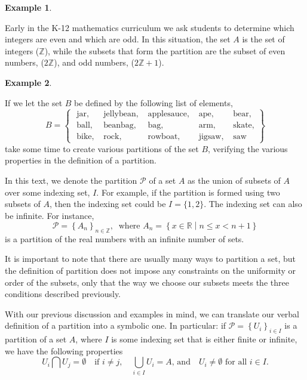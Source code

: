 \documentclass[
]{book}
\theoremstyle{definition}
\theoremstyle{definition}
\newtheorem{example}{Example}[chapter]
\theoremstyle{definition}
\theoremstyle{definition}
\theoremstyle{remark}
\begin{document}
\begin{example}
\protect\hypertarget{exm:unlabeled-div-22}{}\label{exm:unlabeled-div-22}

Early in the K-12 mathematics curriculum we ask students to determine which integers are even and which are odd. In this situation, the set \(A\) is the set of integers (\(\mathbb{Z}\)), while the subsets that form the partition are the subset of even numbers, (\(2\mathbb{Z}\)), and odd numbers, (\(2\mathbb{Z}+1\)).

\end{example}

\begin{example}
\protect\hypertarget{exm:unlabeled-div-23}{}\label{exm:unlabeled-div-23}

If we let the set \(B\) be defined by the following list of elements,
\[B = \begin{Bmatrix} 
\mbox{ jar},  & \mbox{ jellybean} ,  & \mbox{ applesauce}, & \mbox{ ape}, & \mbox{ bear}, \\
\mbox{ ball}, & \mbox{ beanbag}, & \mbox{ bag}, & \mbox{ arm} , & \mbox{ skate} , \\
\mbox{ bike}, & \mbox{ rock}, & \mbox{ rowboat},   &  \mbox{ jigsaw}, & \mbox{ saw}
 \end{Bmatrix}\]
take some time to create various partitions of the set \(B\), verifying the various properties in the definition of a partition.

\end{example}

In this text, we denote the partition \(\mathcal{P}\) of a set \(A\) as the union of subsets of \(A\) over some indexing set, \(I\). For example, if the partition is formed using two subsets of \(A\), then the indexing set could be \(I=\{1,2\}\). The indexing set can also be infinite. For instance,
\[\mathcal{P} = \left\{ A_n  \right\}_{n\in \mathbb{Z}}, \: \mbox{ where } A_n=\left\{x\in \mathbb{R}\middle \vert n\leq x < n+1  \right\}\] is a partition of the real numbers with an infinite number of sets.

It is important to note that there are usually many ways to partition a set, but the definition of partition does not impose any constraints on the uniformity or order of the subsets, only that the way we choose our subsets meets the three conditions described previously.

With our previous discussion and examples in mind, we can translate our verbal definition of a partition into a symbolic one. In particular: if \(\mathcal{P}= \left\{ U_i\right\}_{i\in I}\) is a partition of a set \(A\), where \(I\) is some indexing set that is either finite or infinite, we have the following properties
\[U_i \bigcap U_j = \emptyset \quad \mbox{if } i\neq j, \quad \bigcup_{i\in I} U_i = A \mbox{, and} \quad U_i \neq \emptyset \mbox{ for all } i \in I.\]
\end{document}
